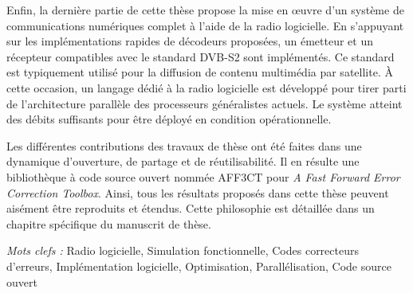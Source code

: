 Enfin, la dernière partie de cette thèse propose la mise en œuvre d'un système
de communications numériques complet à l'aide de la radio logicielle. En
s'appuyant sur les implémentations rapides de décodeurs proposées, un émetteur
et un récepteur compatibles avec le standard DVB-S2 sont implémentés. Ce
standard est typiquement utilisé pour la diffusion de contenu multimédia par
satellite. À cette occasion, un langage dédié à la radio logicielle est
développé pour tirer parti de l'architecture parallèle des processeurs
généralistes actuels. Le système atteint des débits suffisants pour être déployé
en condition opérationnelle.

Les différentes contributions des travaux de thèse ont été faites dans une
dynamique d'ouverture, de partage et de réutilisabilité. Il en résulte une
bibliothèque à code source ouvert nommée AFF3CT pour \emph{A Fast Forward Error
Correction Toolbox}. Ainsi, tous les résultats proposés dans cette thèse peuvent
aisément être reproduits et étendus. Cette philosophie est détaillée dans un
chapitre spécifique du manuscrit de thèse.

\vskip0.5cm
\emph{Mots clefs :} Radio logicielle, Simulation fonctionnelle, Codes
                    correcteurs d'erreurs, Implémentation logicielle,
                    Optimisation, Parallélisation, Code source ouvert
